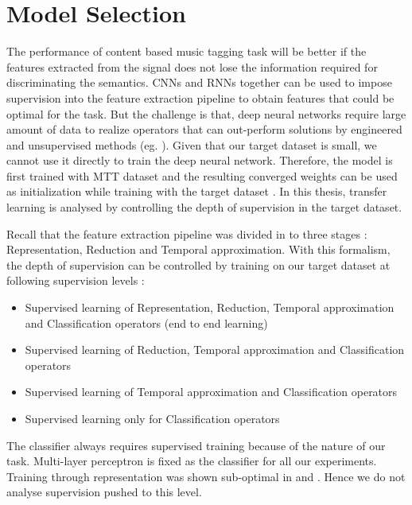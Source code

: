\section{Model Selection}
\label{model}
The performance of content based music tagging task will be better if the features extracted from the signal does not lose the information required for discriminating the semantics. CNNs and RNNs together can be used to impose supervision into the feature extraction pipeline to obtain features that could be optimal for the task. But the challenge is that, deep neural networks require large amount of data to realize operators that can out-perform solutions by engineered and unsupervised methods (eg. \cite{featurelearn1}\cite{MultiScale}). Given that our target dataset is small, we cannot use it directly to train the deep neural network. Therefore, the model is first trained with MTT dataset and the resulting converged weights can be used as initialization while training with the target dataset\cite{TransferLearning} . In this thesis, transfer learning is analysed by controlling the depth of supervision in the target dataset. 
\bigskip

\noindent Recall that the feature extraction pipeline was divided in to three stages : Representation, Reduction and Temporal approximation. With this formalism, the depth of supervision can be controlled by training on our target dataset at following supervision levels :
\begin{itemize}
    \setlength\itemsep{0em}
    \item Supervised learning of Representation, Reduction, Temporal approximation and Classification operators (end to end learning)
    \item Supervised learning of Reduction, Temporal approximation and Classification operators
    \item Supervised learning of Temporal approximation and Classification operators
    \item Supervised learning only for Classification operators
\end{itemize}
The classifier always requires supervised training because of the nature of our task. Multi-layer perceptron is fixed as the classifier for all our experiments. Training through representation was shown sub-optimal in  \cite{EndToEnd} and \cite{choi_cnn}. Hence we do not analyse supervision pushed to this level. 

